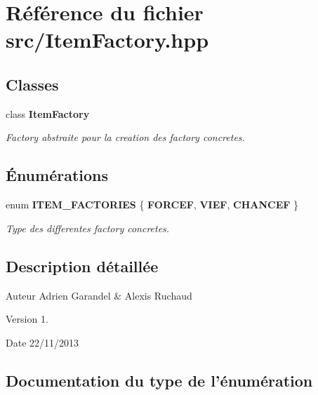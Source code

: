 \section{Référence du fichier src/\-Item\-Factory.hpp}
\label{_item_factory_8hpp}
\subsection*{Classes}
\begin{DoxyCompactItemize}
\item 
class {\bf Item\-Factory}
\begin{DoxyCompactList}\small\item\em Factory abstraite pour la creation des factory concretes. \end{DoxyCompactList}\end{DoxyCompactItemize}
\subsection*{Énumérations}
\begin{DoxyCompactItemize}
\item 
enum {\bf I\-T\-E\-M\-\_\-\-F\-A\-C\-T\-O\-R\-I\-E\-S} \{ {\bf F\-O\-R\-C\-E\-F}, 
{\bf V\-I\-E\-F}, 
{\bf C\-H\-A\-N\-C\-E\-F}
 \}
\begin{DoxyCompactList}\small\item\em Type des differentes factory concretes. \end{DoxyCompactList}\end{DoxyCompactItemize}


\subsection{Description détaillée}
\begin{DoxyAuthor}{Auteur}
Adrien Garandel \& Alexis Ruchaud 
\end{DoxyAuthor}
\begin{DoxyVersion}{Version}
1. 
\end{DoxyVersion}
\begin{DoxyDate}{Date}
22/11/2013 
\end{DoxyDate}


\subsection{Documentation du type de l'énumération}
